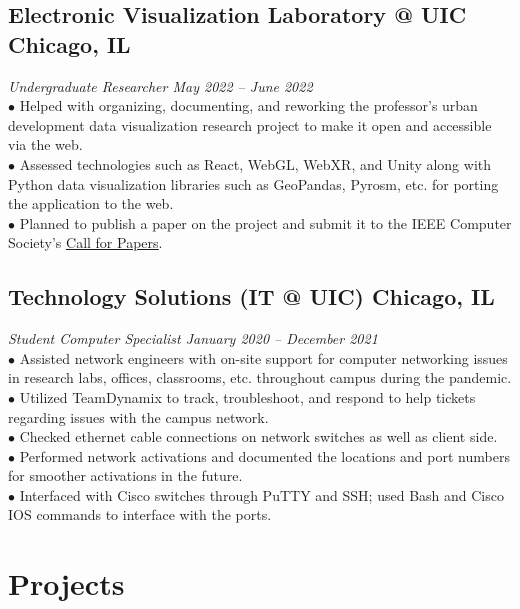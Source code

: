 \documentclass{article}
\begin{document}
\subsection{Electronic Visualization Laboratory @ UIC \hfill \textnormal{Chicago, IL}}
\vspace{-0.5em}
\textit{Undergraduate Researcher \hfill May 2022 -- June 2022}
\\
$\bullet$ Helped with organizing, documenting, and reworking the professor's urban development data visualization research project to make it open and accessible via the web.
\\
$\bullet$ Assessed technologies such as React, WebGL, WebXR, and Unity along with Python data visualization libraries such as GeoPandas, Pyrosm, etc. for porting the application to the web.
\\
$\bullet$ Planned to publish a paper on the project and submit it to the IEEE Computer Society's \href{https://www.computer.org/digital-library/magazines/cg/cfp-metaverse-virtual-worlds}{\underline{Call for Papers}}. %


\subsection{Technology Solutions (IT @ UIC) \hfill \textnormal{Chicago, IL}}
\vspace{-0.5em}
\textit{Student Computer Specialist \hfill January 2020 -- December 2021}
\\
$\bullet$ Assisted network engineers with on-site support for computer networking issues in research labs, offices, classrooms, etc. throughout campus during the pandemic.
\\
$\bullet$ Utilized TeamDynamix to track, troubleshoot, and respond to help tickets regarding issues with the campus network.
\\
$\bullet$ Checked ethernet cable connections on network switches as well as client side.
\\
$\bullet$ Performed network activations and documented the locations and port numbers for smoother activations in the future.
\\
$\bullet$ Interfaced with Cisco switches through PuTTY and SSH; used Bash and Cisco IOS commands to interface with the ports.


\section{Projects}
\end{document}
